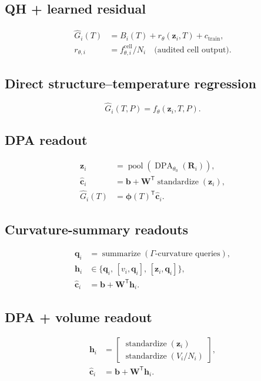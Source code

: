 \documentclass{article}
\begin{document}
\subsection*{QH + learned residual}
\[\begin{aligned}\widehat G_i(T)&=B_i(T)+r_\theta(\mathbf z_i,T)+c_{\mathrm{train}},\\r_{\theta,i}&=f_{\theta,i}^{\mathrm{cell}}/N_i\quad\text{(audited cell output).}\end{aligned}\]
\subsection*{Direct structure–temperature regression}
\[\widehat G_i(T,P)=f_\theta(\mathbf z_i,T,P).\]
\subsection*{DPA readout}
\[\begin{aligned}\mathbf z_i&=\operatorname{pool}\!\left(\operatorname{DPA}_{\theta_0}(\mathbf R_i)\right),\\\widehat{\mathbf c}_i&=\mathbf b+\mathbf W^{\mathsf T}\operatorname{standardize}(\mathbf z_i),\\\widehat G_i(T)&=\boldsymbol\phi(T)^{\mathsf T}\widehat{\mathbf c}_i.\end{aligned}\]
\subsection*{Curvature-summary readouts}
\[\begin{aligned}\mathbf q_i&=\operatorname{summarize}\!\left(\Gamma\text{-curvature queries}\right),\\\mathbf h_i&\in\{\mathbf q_i,\,[v_i,\mathbf q_i],\,[\mathbf z_i,\mathbf q_i]\},\\\widehat{\mathbf c}_i&=\mathbf b+\mathbf W^{\mathsf T}\mathbf h_i.\end{aligned}\]
\subsection*{DPA + volume readout}
\[\begin{aligned}\mathbf h_i&=\begin{bmatrix}\operatorname{standardize}(\mathbf z_i)\\\operatorname{standardize}(V_i/N_i)\end{bmatrix},\\\widehat{\mathbf c}_i&=\mathbf b+\mathbf W^{\mathsf T}\mathbf h_i.\end{aligned}\]
\end{document}

